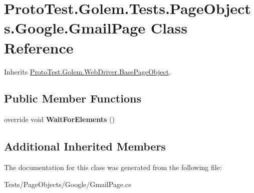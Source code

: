 \hypertarget{class_proto_test_1_1_golem_1_1_tests_1_1_page_objects_1_1_google_1_1_gmail_page}{\section{Proto\-Test.\-Golem.\-Tests.\-Page\-Objects.\-Google.\-Gmail\-Page Class Reference}
\label{class_proto_test_1_1_golem_1_1_tests_1_1_page_objects_1_1_google_1_1_gmail_page}
}


Inherits \hyperlink{class_proto_test_1_1_golem_1_1_web_driver_1_1_base_page_object}{Proto\-Test.\-Golem.\-Web\-Driver.\-Base\-Page\-Object}.

\subsection*{Public Member Functions}
\begin{DoxyCompactItemize}
\item 
\hypertarget{class_proto_test_1_1_golem_1_1_tests_1_1_page_objects_1_1_google_1_1_gmail_page_aaf83d0677a0c5ddf8e95cf6a3172a4fa}{override void {\bfseries Wait\-For\-Elements} ()}\label{class_proto_test_1_1_golem_1_1_tests_1_1_page_objects_1_1_google_1_1_gmail_page_aaf83d0677a0c5ddf8e95cf6a3172a4fa}

\end{DoxyCompactItemize}
\subsection*{Additional Inherited Members}


The documentation for this class was generated from the following file\-:\begin{DoxyCompactItemize}
\item 
Tests/\-Page\-Objects/\-Google/Gmail\-Page.\-cs\end{DoxyCompactItemize}
